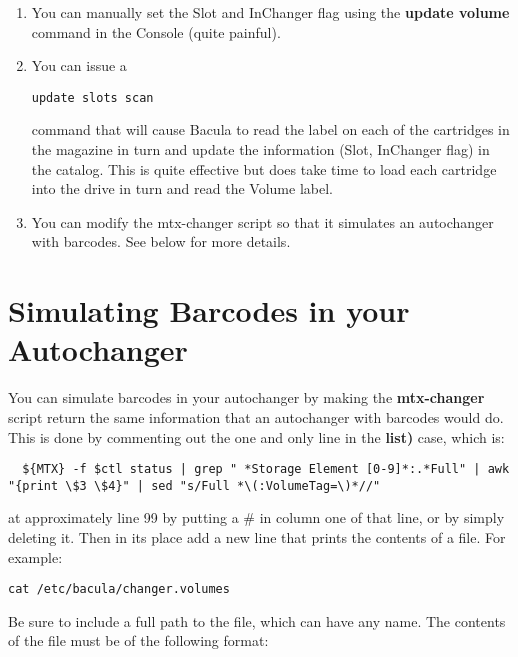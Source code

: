 \begin{enumerate}
\item You can manually set the Slot and InChanger flag using  the {\bf update
   volume} command in the Console (quite  painful). 

\item You can issue a 

\footnotesize
\begin{verbatim}
update slots scan
\end{verbatim}
\normalsize

   command that will cause Bacula to read the label on each  of the cartridges in
   the magazine in turn and update the  information (Slot, InChanger flag) in the
   catalog. This  is quite effective but does take time to load each cartridge 
   into the drive in turn and read the Volume label.  

\item You can modify the mtx-changer script so that it simulates  an
   autochanger with barcodes. See below for more details. 
\end{enumerate}

\label{simulating}
\section{Simulating Barcodes in your Autochanger}

You can simulate barcodes in your autochanger by making the {\bf mtx-changer}
script return the same information that an autochanger with barcodes would do.
This is done by commenting out the one and only line in the {\bf list)} case,
which is: 

\footnotesize
\begin{verbatim}
  ${MTX} -f $ctl status | grep " *Storage Element [0-9]*:.*Full" | awk "{print \$3 \$4}" | sed "s/Full *\(:VolumeTag=\)*//"
\end{verbatim}
\normalsize

at approximately line 99 by putting a \# in column one of that line, or by
simply deleting it. Then in its place add a new line that prints the contents
of a file. For example: 

\footnotesize
\begin{verbatim}
cat /etc/bacula/changer.volumes
\end{verbatim}
\normalsize

Be sure to include a full path to the file, which can have any name. The
contents of the file must be of the following format: 

